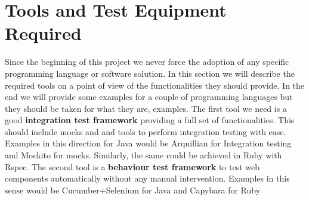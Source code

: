 \pagebreak
\section{Tools and Test Equipment Required}
Since the beginning of this project we never force the adoption of any specific
programming language or software solution. In this section we will describe the
required tools on a point of view of the functionalities they should provide.
In the end we will provide some examples for a couple of programming languages
but they should be taken for what they are, examples.
The first tool we need is a good \textbf{integration test framework}
providing a full set of functionalities. This should include mocks and
and tools to perform integration testing with ease.
Examples in this direction for Java would be Arquillian for Integration testing
and Mockito for mocks.
Similarly, the same could be achieved in Ruby with Rspec.
The second tool is a \textbf{behaviour test framework} to test web components automatically
without any manual intervention.
Examples in this sense would be Cucumber+Selenium for Java and Capybara for Ruby
